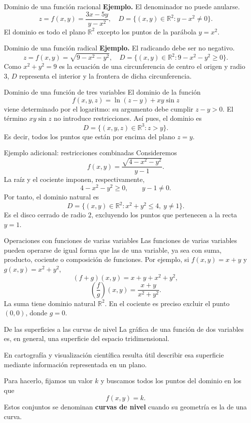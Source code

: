 \documentclass[main.tex]{subfiles}
\begin{document}
\begin{frame}{Dominio de una función racional}
\textbf{Ejemplo.} El denominador no puede anularse.
\[z=f(x,y)=\frac{3x-5y}{y-x^2},\quad D=\{(x,y)\in\mathbb{R}^2:y-x^2\ne0\}.\]
El dominio es todo el plano $\mathbb{R}^2$ excepto los puntos de la parábola $y=x^2$.
\end{frame}
\begin{frame}{Dominio de una función radical}
\textbf{Ejemplo.} El radicando debe ser no negativo.
\[z=f(x,y)=\sqrt{9-x^2-y^2},\quad D=\{(x,y)\in\mathbb{R}^2:9-x^2-y^2\ge0\}.\]
\small Como $x^2+y^2=9$ es la ecuación de una circunferencia de centro el origen y radio $3$, $D$ representa el interior y la frontera de dicha circunferencia.
\end{frame}
\begin{frame}{Dominio de una función de tres variables}
El dominio de la función
\[f(x,y,z)=\ln(z-y)+xy\sin z\]
viene determinado por el logaritmo: su argumento debe cumplir
$z-y>0$. El término $xy\sin z$ no introduce restricciones.
Así pues, el dominio es
\[D=\{(x,y,z)\in\mathbb{R}^3:z>y\}.\]
Es decir, todos los puntos que están por encima del plano $z=y$.
\end{frame}
\begin{frame}{Ejemplo adicional: restricciones combinadas}
Consideremos
\[
f(x,y)=\frac{\sqrt{4-x^2-y^2}}{y-1}.
\]
La raíz y el cociente imponen, respectivamente,
\[
4-x^2-y^2\geq0,\qquad y-1\neq0.
\]
Por tanto, el dominio natural es
\[
\boxed{D=\{(x,y)\in\mathbb R^2:
x^2+y^2\leq4,\ y\neq1\}.}
\]
\medskip
Es el disco cerrado de radio $2$, excluyendo los puntos
que pertenecen a la recta $y=1$.
\end{frame}

\begin{frame}{Operaciones con funciones de varias variables}
Las funciones de varias variables pueden operarse de igual forma que las de una variable, ya sea con suma, producto, cociente o composición de funciones.
\medskip
Por ejemplo, si $f(x,y)=x+y$ y $g(x,y)=x^2+y^2$,
\[
(f+g)(x,y)=x+y+x^2+y^2,
\]
\[
\left(\frac fg\right)(x,y)=\frac{x+y}{x^2+y^2}.
\]
\small
La suma tiene dominio natural $\mathbb R^2$. En el cociente
es preciso excluir el punto $(0,0)$, donde $g=0$.
\end{frame}
\begin{frame}{De las superficies a las curvas de nivel}
La gráfica de una función de dos variables es, en general,
una superficie del espacio tridimensional.
\medskip

En cartografía y visualización científica resulta útil describir
esa superficie mediante información representada en un plano.
\medskip

Para hacerlo, fijamos un valor $k$ y buscamos todos los puntos
del dominio en los que
\[
f(x,y)=k.
\]
\medskip
Estos conjuntos se denominan \textbf{curvas de nivel} cuando
su geometría es la de una curva.
\end{frame}
\end{document}
